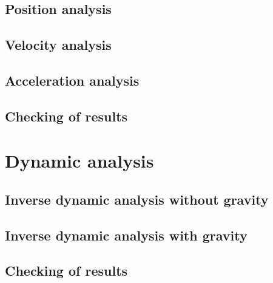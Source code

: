 \documentclass[a4paper]{article}
\begin{document}
\subsection{Position analysis}

\subsection{Velocity analysis}

\subsection{Acceleration analysis}

\subsection{Checking of results}

\section{Dynamic analysis}

\subsection{Inverse dynamic analysis without gravity}

\subsection{Inverse dynamic analysis with gravity}

\subsection{Checking of results}



\end{document}
